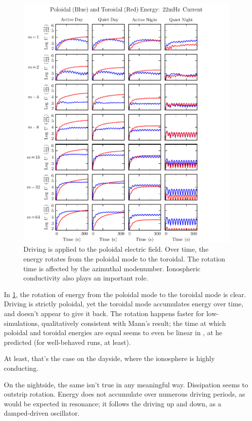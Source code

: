 \begin{figure}[H]
    \centering
    \includegraphics[width=\textwidth]{figures/U_PT_022mHz.pdf}
    \caption[Current-Driven Poloidal and Toroidal Energy: 22mHz]{
      Driving is applied to the poloidal electric field. Over time, the energy rotates from the poloidal mode to the toroidal. The rotation time is affected by the azimuthal modenumber. Ionospheric conductivity also plays an important role. 
    }
    \label{fig_U_PT_022mHz}
\end{figure}

In \cref{fig_U_PT_022mHz}, the rotation of energy from the poloidal mode to the toroidal mode is clear. Driving is strictly poloidal, yet the toroidal mode accumulates energy over time, and doesn't appear to give it back. The rotation happens faster for low-\azm simulations, qualitatively consistent with Mann's result; the time at which poloidal and toroidal energies are equal seems to even be linear in \azm, at he predicted (for well-behaved runs, at least). 

At least, that's the case on the dayside, where the ionosphere is highly conducting. 

On the nightside, the same isn't true in any meaningful way. Dissipation seems to outstrip rotation. Energy does not accumulate over numerous driving periods, as would be expected in resonance; it follows the driving up and down, as a damped-driven oscillator. 

